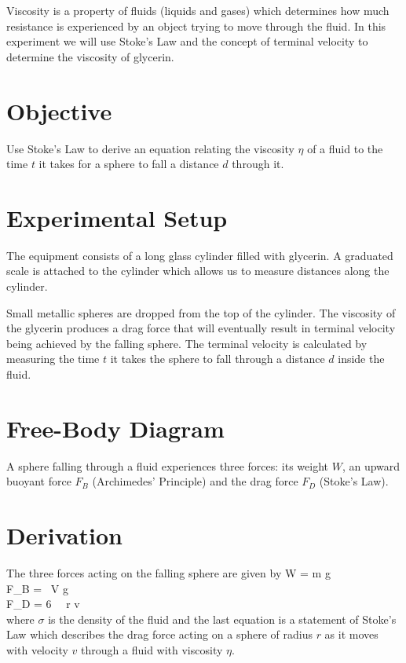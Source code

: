 Viscosity is a property of fluids (liquids and gases) which determines how much resistance is experienced by an object trying to move through the fluid. In this experiment we will use Stoke's Law and the concept of terminal velocity to determine the viscosity of glycerin.

\section*{Objective}

   Use Stoke's Law to derive an equation relating the viscosity $\eta$ of a fluid to the time $t$ it takes for a sphere to fall a distance $d$ through it.

\section*{Experimental Setup}

   The equipment consists of a long glass cylinder filled with glycerin. A graduated scale is attached to the cylinder which allows us to measure distances along the cylinder.
   
   Small metallic spheres are dropped from the top of the cylinder. The viscosity of the glycerin produces a drag force that will eventually result in terminal velocity being achieved by the falling sphere. The terminal velocity is calculated by measuring the time $t$ it takes the sphere to fall through a distance $d$ inside the fluid.

   \diag

\section*{Free-Body Diagram}

   A sphere falling through a fluid experiences three forces: its weight $W$, an upward buoyant force $F_B$ (Archimedes' Principle) and the drag force $F_D$ (Stoke's Law).

   \diag

\section*{Derivation}

   The three forces acting on the falling sphere are given by
   \beqc \label{three_forces}
      W = m g\\
      F_B = \sigma \, V g\\
      F_D = 6 \pi \, \eta \, r v\\
   \eeqc
   where $\sigma$ is the density of the fluid and the last equation is a statement of Stoke's Law which describes the drag force acting on a sphere of radius $r$ as it moves with velocity $v$ through a fluid with viscosity $\eta$.

